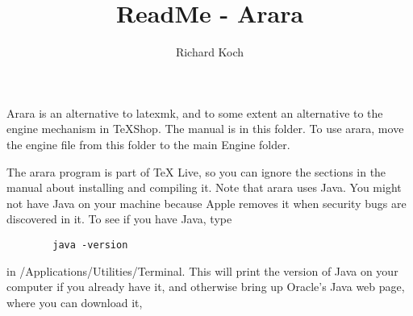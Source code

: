 \documentclass[11pt, oneside]{amsart}
\title{ReadMe - Arara}
\author{Richard Koch}
\begin{document}
\maketitle

\thispagestyle{empty}
\vspace{-.3in}

Arara is an alternative to latexmk, and to some extent an alternative to the engine mechanism in TeXShop. The manual is in this folder. To use arara,  move the engine file from this
folder to the main Engine folder.

The arara program is part of TeX Live, so you can ignore the sections in the manual about installing  and compiling it. Note that arara uses Java. You might not have Java on your machine because Apple removes it when security bugs are discovered in it. To see if you have Java, type
\begin{verbatim}
     	java -version
\end{verbatim} 
in /Applications/Utilities/Terminal. This will print the version of Java on your computer if you already have it, and otherwise bring up Oracle's Java web page, where you can download it,
 
\end{document}
